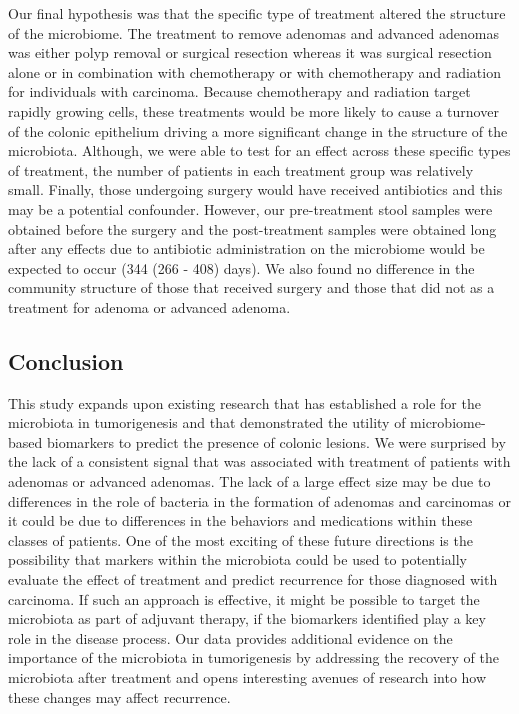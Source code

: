 \documentclass[12pt,]{article}
\begin{document}
Our final hypothesis was that the specific type of treatment altered the
structure of the microbiome. The treatment to remove adenomas and
advanced adenomas was either polyp removal or surgical resection whereas
it was surgical resection alone or in combination with chemotherapy or
with chemotherapy and radiation for individuals with carcinoma. Because
chemotherapy and radiation target rapidly growing cells, these
treatments would be more likely to cause a turnover of the colonic
epithelium driving a more significant change in the structure of the
microbiota. Although, we were able to test for an effect across these
specific types of treatment, the number of patients in each treatment
group was relatively small. Finally, those undergoing surgery would have
received antibiotics and this may be a potential confounder. However,
our pre-treatment stool samples were obtained before the surgery and the
post-treatment samples were obtained long after any effects due to
antibiotic administration on the microbiome would be expected to occur
(344 (266 - 408) days). We also found no difference in the community
structure of those that received surgery and those that did not as a
treatment for adenoma or advanced adenoma.

\subsection{Conclusion}\label{conclusion}

This study expands upon existing research that has established a role
for the microbiota in tumorigenesis and that demonstrated the utility of
microbiome-based biomarkers to predict the presence of colonic lesions.
We were surprised by the lack of a consistent signal that was associated
with treatment of patients with adenomas or advanced adenomas. The lack
of a large effect size may be due to differences in the role of bacteria
in the formation of adenomas and carcinomas or it could be due to
differences in the behaviors and medications within these classes of
patients. One of the most exciting of these future directions is the
possibility that markers within the microbiota could be used to
potentially evaluate the effect of treatment and predict recurrence for
those diagnosed with carcinoma. If such an approach is effective, it
might be possible to target the microbiota as part of adjuvant therapy,
if the biomarkers identified play a key role in the disease process. Our
data provides additional evidence on the importance of the microbiota in
tumorigenesis by addressing the recovery of the microbiota after
treatment and opens interesting avenues of research into how these
changes may affect recurrence.
\end{document}
